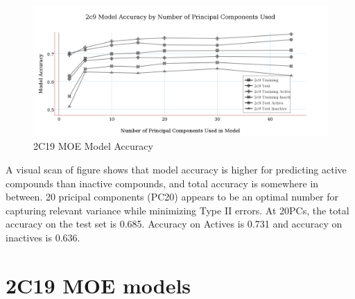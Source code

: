 \begin{figure}[!htbp]
\includegraphics[width=1\textwidth]{../img/2c9_moe_model_accuracy.png}
\caption{2C19 MOE Model Accuracy}
\end{figure}

A visual scan of figure shows that model accuracy is higher for predicting active compounds than inactive compounds, and total accuracy is somewhere in between. 20 pricipal components (PC20) appears to be an optimal number for capturing relevant variance while minimizing Type II errors. At 20PCs, the total accuracy on the test set is 0.685. Accuracy on Actives is 0.731 and accuracy on inactives is 0.636.


\section{2C19 MOE models}

